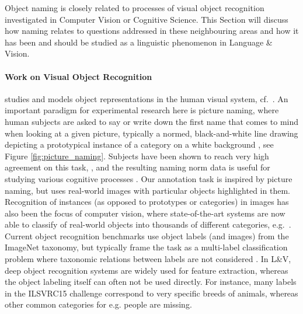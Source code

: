
Object naming is closely related to processes of visual object recognition investigated in Computer Vision or Cognitive Science.
This Section will discuss how naming relates to questions addressed in these neighbouring areas and how it has been and should be studied as a linguistic phenomenon in Language \& Vision.



\paragraph{Work on Visual Object Recognition} studies and models object representations in the human visual system, cf.\ \cite{regan2000human,rossion2004revisiting}. 
An important paradigm for experimental research here is picture naming, where human subjects are asked to say or write down the first name that comes to mind when looking at a given picture, typically a normed, black-and-white line drawing depicting a prototypical instance of a category on a white background \cite{snodgrass}, see Figure \ref{fig:picture_naming}.
Subjects have been shown to reach very high agreement on this task, \cite{rossion2004revisiting}, and the resulting naming norm data is useful for studying various cognitive processes \cite{humphreys1988cascade}.
Our annotation task is inspired by picture naming, but uses real-world images with particular objects highlighted in them.
Recognition of instances (as opposed to prototypes or categories) in images has also been the focus of computer vision, where state-of-the-art systems are now able to classify of real-world objects into thousands of different categories, e.g.\  . 
Current object recognition benchmarks use object labels (and images) from the ImageNet \cite{imagenet_cvpr09} taxonomy, but typically frame the task as a multi-label classification problem where taxonomic relations between labels are not considered \cite{ILSVRC15}. 
In L\&V,  deep object recognition systems are widely used for feature extraction, whereas the object labeling itself can often not be used directly. For instance, many labels in the ILSVRC15 challenge correspond to very specific breeds of animals, whereas other common categories  for e.g. people are missing.


